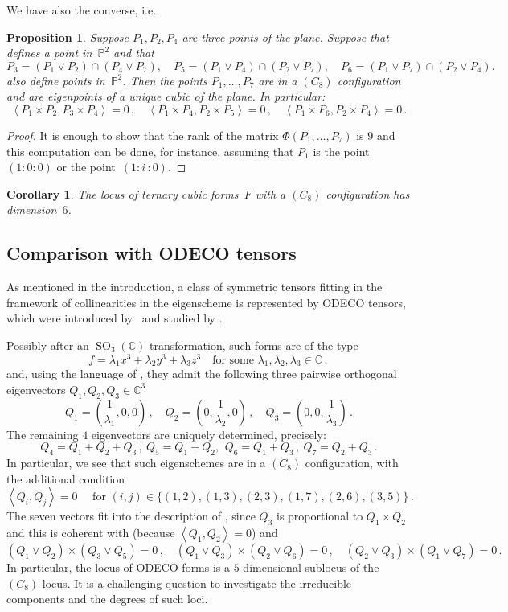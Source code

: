 \documentclass[a4paper, 11pt, reqno]{amsart}
\theoremstyle{plain}
\newtheorem{prop}[lemma]{Proposition}
\newtheorem{corollary}[lemma]{Corollary}
\theoremstyle{definition}
\newcommand{\C}{\mathbb{C}}
\newcommand{\p}{\mathbb{P}}
\newcommand{\iii}{\textit{i}\,}
\newcommand{\SO}{\operatorname{SO}}
\newcommand{\scl}[2]{\left\langle {#1}, {#2} \right\rangle}
\begin{document}
We have also the converse, i.e.\
\begin{prop}
Suppose $P_1, P_2, P_4$ are three points of the plane. Suppose that  defines a point in~$\p^2$ and that
%
\[
P_3 = (P_1 \vee P_2) \cap(P_4 \vee P_7), \quad 
P_5 = (P_1 \vee P_4) \cap (P_2 \vee P_7), \quad
P_6 = (P_1 \vee P_7) \cap (P_2 \vee P_4).
\]
%
also define points in~$\p^2$.
Then the points $P_1, \dotsc, P_7$ are in a $(C_8)$ configuration
and are eigenpoints of a unique cubic 
of the plane. In particular:
\[
  \scl{P_1 \times P_2}{P_3 \times P_4} = 0 \,, \quad 
  \scl{P_1 \times P_4}{P_2 \times P_5} = 0 \,, \quad 
  \scl{P_1 \times P_6}{P_2 \times P_4} = 0 \,.
\]
\end{prop}
\begin{proof}
It is enough to show that the rank of the matrix $\Phi(P_1, \dots, P_7)$
is $9$ and this computation can be done, for instance, assuming that 
$P_1$ is the point~$(1: 0: 0)$ or the point~$(1: \iii: 0)$.
\end{proof}

\begin{corollary}
The locus of ternary cubic forms~$F$ with a $(C_8)$ configuration has dimension~$6$.
\end{corollary}


\subsection*{Comparison with ODECO tensors}
As mentioned in the introduction, a class of
symmetric tensors fitting in the framework of collinearities in the eigenscheme is represented by ODECO tensors, which were introduced by~\cite{Rob} and studied by \cite{BDHE, Koiran2021, Biaggi2022}.

Possibly after an $\SO_3(\C)$ transformation, such forms are of the type
%
\[
  f = \lambda_1 x^3 +\lambda_2 y^3 + \lambda_3 z^3
  \quad \text{for some } \lambda_1, \lambda_2, \lambda_3 \in \C \,,
\]
%
and, using the language of \cite{Rob}, they admit the following three pairwise orthogonal eigenvectors $Q_1, Q_2, Q_3 \in \C^3$
%
\[
  Q_1 = \left( \frac{1}{\lambda_1},0,0 \right) \,, \quad
  Q_2 = \left( 0,\frac{1}{\lambda_2},0 \right) \,, \quad
  Q_3 = \left( 0,0,\frac{1}{\lambda_3} \right) \,.
\]
%
The remaining $4$ eigenvectors are uniquely determined, precisely:
%
\[
  Q_4 = Q_1+Q_2+Q_3\,, \ Q_5 = Q_1+Q_2,\, \ Q_6 = Q_1+Q_3 \,, \ Q_7 = Q_2+Q_3\,.
\]
%
In particular, we see that such eigenschemes are in a $(C_8)$ configuration, with the additional condition
%
\[
  \left\langle Q_i,Q_j \right\rangle = 0
  \quad \text{ for } (i, j) \in \{(1, 2), (1, 3), (2, 3), (1, 7), (2, 6), (3, 5)\} \,.
\]
%
The seven vectors fit into the description of , since $Q_3 $ is proportional to $Q_1 \times Q_2$ and this is coherent with 
(because $\scl{Q_1}{Q_2} = 0$)
and
%
\[
  (Q_1 \vee Q_2) \times (Q_3 \vee Q_5) = 0 \,, \quad
  (Q_1 \vee Q_3) \times (Q_2 \vee Q_6) = 0 \,, \quad
  (Q_2 \vee Q_3) \times (Q_1 \vee Q_7) = 0 \,.
\]
%
In particular, the locus of ODECO forms is a $5$-dimensional sublocus of the $(C_8)$ locus.
It is a challenging question to investigate the irreducible components and the degrees of such loci.




\end{document}
